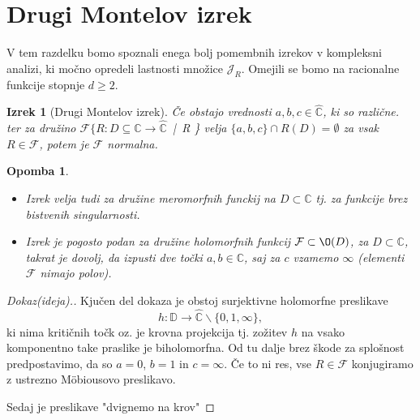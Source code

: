 \documentclass{article}
\newtheorem{opomba}{Opomba}
\newtheorem{izrek}{Izrek}
\newcommand{\C}{\mathbb{C}}
\newcommand{\D}{\mathbb{D}}
\newcommand{\F}{\mathcal{F}}
\begin{document}
\section{Drugi Montelov izrek}

V tem razdelku bomo spoznali enega bolj pomembnih izrekov v kompleksni analizi, 
ki močno opredeli lastnosti množice $\mathcal{J}_R$. Omejili se bomo 
na racionalne funkcije stopnje $d \geq 2$. 

\begin{izrek}[Drugi Montelov izrek]
Če obstajo vrednosti $a, b, c \in \hat{\C}$, ki so različne. ter za družino 
$\F \{R: D \subseteq \hat{\C} \rightarrow \hat{\C}$ \,|\, R \} 
velja $\{a, b, c\} \cap R(D) = \emptyset$ za vsak $R \in \F$, potem je 
$\F$ normalna. 
\end{izrek}

\begin{opomba}
\begin{itemize}
    \item Izrek velja tudi za družine meromorfnih funckij na $D \subset \C$ tj. 
    za funkcije brez bistvenih singularnosti.
    \item Izrek je pogosto podan za družine holomorfnih funkcij $\F \subset \O(D)$, 
    za $D \subset \C$, takrat je dovolj, da izpusti dve točki $a, b \in \C$, saj 
    za $c$ vzamemo $\infty$ (elementi $\F$ nimajo polov).
\end{itemize}
\end{opomba}

\begin{proof}[Dokaz(ideja).]
Kjučen del dokaza je obstoj surjektivne holomorfne preslikave 
$$
h: \D \rightarrow \hat{\C}\backslash \{0, 1, \infty\},
$$
ki nima kritičnih točk oz. je krovna projekcija tj. zožitev $h$ na vsako 
komponentno take praslike je biholomorfna. Od tu dalje brez škode za splošnost 
predpostavimo, da so $a = 0$, $b=1$ in $c = \infty$. Če to ni res, vse 
$R \in \F$ konjugiramo z ustrezno Möbiousovo preslikavo. 

Sedaj je preslikave "dvignemo na krov"
\end{proof}
\end{document}
